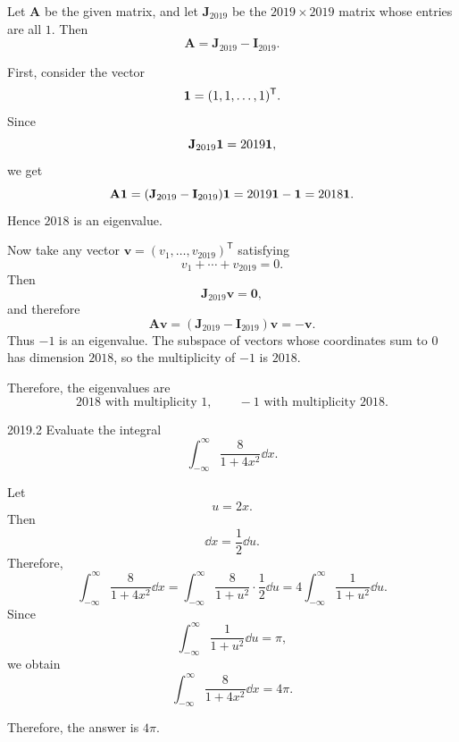    \begin{solution}
        Let $\mathbf{A}$ be the given matrix, and let $\mathbf{J}_{2019}$ be the $2019\times 2019$ matrix
        whose entries are all $1$. Then
        \[
            \mathbf{A}=\mathbf{J}_{2019}-\mathbf{I}_{2019}.
        \]

        First, consider the vector
        \[
            \mathbf{1}=(1,1,\dots,1)^{\mathsf T}.
        \]
        Since
        \[
            \mathbf{J}_{2019}\mathbf{1}=2019\mathbf{1},
        \]
        we get
        \[
            \mathbf{A}\mathbf{1}
            =
            (\mathbf{J}_{2019}-\mathbf{I}_{2019})\mathbf{1}
            =
            2019\mathbf{1}-\mathbf{1}
            =
            2018\mathbf{1}.
        \]
        Hence $2018$ is an eigenvalue.

        Now take any vector $\mathbf{v}=(v_1,\dots,v_{2019})^{\mathsf T}$ satisfying
        \[
            v_1+\cdots+v_{2019}=0.
        \]
        Then
        \[
            \mathbf{J}_{2019}\mathbf{v}=\mathbf{0},
        \]
        and therefore
        \[
            \mathbf{A}\mathbf{v}
            =
            (\mathbf{J}_{2019}-\mathbf{I}_{2019})\mathbf{v}
            =
            -\mathbf{v}.
        \]
        Thus $-1$ is an eigenvalue. The subspace of vectors whose coordinates sum to $0$ has
        dimension $2018$, so the multiplicity of $-1$ is $2018$.

        Therefore, the eigenvalues are
        \[
            \boxed{2018 \text{ with multiplicity } 1,\qquad -1 \text{ with multiplicity } 2018}.
        \]
    \end{solution}

    \begin{pastproblem}{2019.2}
        Evaluate the integral
        \[
            \int_{-\infty}^{\infty}
            \frac{8}{1+4x^2}\dd x.
        \]
    \end{pastproblem}

    \begin{solution}
        Let
        \[
            u=2x.
        \]
        Then
        \[
            \dd x=\frac{1}{2}\dd u.
        \]
        Therefore,
        \[
            \int_{-\infty}^{\infty}
            \frac{8}{1+4x^2}\dd x
            =
            \int_{-\infty}^{\infty}
            \frac{8}{1+u^2}\cdot\frac{1}{2}\dd u
            =
            4\int_{-\infty}^{\infty}
            \frac{1}{1+u^2}\dd u.
        \]
        Since
        \[
            \int_{-\infty}^{\infty}
            \frac{1}{1+u^2}\dd u
            =
            \pi,
        \]
        we obtain
        \[
            \int_{-\infty}^{\infty}
            \frac{8}{1+4x^2}\dd x
            =
            4\pi.
        \]

        Therefore, the answer is $\boxed{4\pi}$.
    \end{solution}

